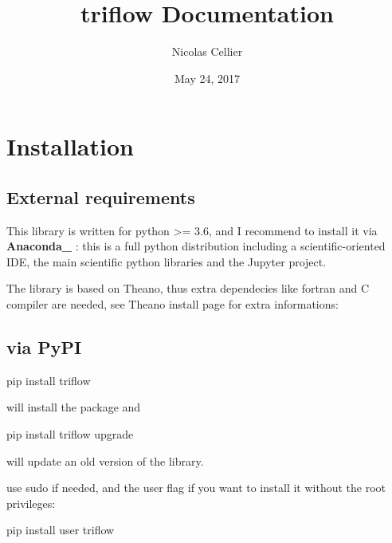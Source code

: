 \documentclass[letterpaper,10pt,english]{sphinxmanual}
\title{triflow Documentation}
\date{May 24, 2017}
\author{Nicolas Cellier}
\begin{document}
\maketitle
\sphinxtableofcontents
{}\label{\detokenize{index::doc}}



\chapter{Installation}
\label{\detokenize{installation:installation}}\label{\detokenize{installation::doc}}\label{\detokenize{installation:welcome-to-triflow-s-documentation}}

\section{External requirements}
\label{\detokenize{installation:external-requirements}}
This library is written for python \textgreater{}= 3.6, and I recommend to install it via {\color{red}\bfseries{}Anaconda\_} : this is a full python distribution including a scientific-oriented IDE, the main scientific python libraries and the Jupyter project.

The library is based on Theano, thus extra dependecies like fortran and C compiler are needed, see Theano install page for extra informations:



\section{via PyPI}
\label{\detokenize{installation:via-pypi}}
\begin{sphinxVerbatim}[commandchars=\\\{\}]
pip install triflow
\end{sphinxVerbatim}

will install the package and

\begin{sphinxVerbatim}[commandchars=\\\{\}]
pip install triflow \PYGZhy{}\PYGZhy{}upgrade
\end{sphinxVerbatim}

will update an old version of the library.

use sudo if needed, and the user flag if you want to install it without the root privileges:

\begin{sphinxVerbatim}[commandchars=\\\{\}]
pip install \PYGZhy{}\PYGZhy{}user triflow
\end{sphinxVerbatim}
\end{document}
